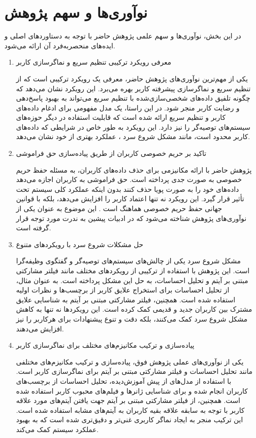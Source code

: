 \section{نوآوری‌ها و سهم پژوهش}
در این بخش، نوآوری‌ها و سهم علمی پژوهش حاضر با توجه به دستاوردهای اصلی و ایده‌های منحصربه‌فرد آن ارائه می‌شود.
\begin{enumerate}
\item
معرفی رویکرد ترکیبی تنظیم سریع و نماگر‌سازی کاربر

یکی از مهم‌ترین نوآوری‌های پژوهش حاضر، معرفی یک رویکرد ترکیبی است که از تنظیم سریع و نماگر‌سازی پیشرفته کاربر بهره می‌برد. این رویکرد نشان می‌دهد که چگونه تلفیق داده‌های شخصی‌سازی‌شده با تنظیم سریع می‌تواند به بهبود پاسخ‌دهی و رضایت کاربر منجر شود. در این راستا، یک مدل مفهومی برای ادغام داده‌های کاربر و تنظیم سریع ارائه شده است که قابلیت استفاده در دیگر حوزه‌های سیستم‌های توصیه‌گر را نیز دارد. این رویکرد به طور خاص در شرایطی که داده‌های کاربر محدود است، مانند مشکل شروع سرد ، عملکرد بهتری از خود نشان می‌دهد.

\item
تاکید بر حریم خصوصی کاربران از طریق پیاده‌سازی حق فراموشی

پژوهش حاضر با ارائه مکانیزمی برای حذف داده‌های کاربران، به مسئله حفظ حریم خصوصی به صورت جدی پرداخته است. حق فراموشی به کاربران اجازه می‌دهد داده‌های خود را به صورت پویا حذف کنند بدون اینکه عملکرد کلی سیستم تحت تأثیر قرار گیرد. این رویکرد نه تنها اعتماد کاربر را افزایش می‌دهد، بلکه با قوانین جهانی حفظ حریم خصوصی هماهنگ است . این موضوع به عنوان یکی از نوآوری‌های پژوهش شناخته می‌شود که در ادبیات پیشین به ندرت مورد توجه قرار گرفته است.

\item
حل مشکلات شروع سرد با رویکردهای متنوع

مشکل شروع سرد یکی از چالش‌های سیستم‌های توصیه‌گر و گفتگوی وظیفه‌گرا است. این پژوهش با استفاده از ترکیبی از رویکردهای مختلف مانند فیلتر مشارکتی مبتنی بر آیتم و تحلیل احساسات، به حل این مشکل پرداخته است. به عنوان مثال، از تحلیل احساسات برای استخراج علایق کاربر از برچسب‌ها و نظرات اولیه استفاده شده است. همچنین، فیلتر مشارکتی مبتنی بر آیتم به شناسایی علایق مشترک بین کاربران جدید و قدیمی کمک کرده است. این رویکردها نه تنها به کاهش مشکل شروع سرد کمک می‌کنند، بلکه دقت و تنوع پیشنهادات برای هرکاربر را نیز افزایش می‌دهند.

\item
پیاده‌سازی و ترکیب مکانیزم‌های مختلف برای نماگر‌سازی کاربر

یکی از نوآوری‌های عملی پژوهش فوق، پیاده‌سازی و ترکیب مکانیزم‌های مختلفی مانند تحلیل احساسات و فیلتر مشارکتی مبتنی بر آیتم برای نماگر‌سازی کاربر است. با استفاده از مدل‌های از پیش آموزش‌دیده، تحلیل احساسات از برچسب‌های کاربران انجام شده و برای شناسایی ژانرها و فیلم‌های محبوب کاربر استفاده شده است. همچنین، از فیلتر مشارکتی مبتنی بر آیتم جهت یافتن آیتم‌های مورد علاقه کاربر با توجه به سابقه علاقه بقیه کاربران به آیتم‌های مشابه استفاده شده است. این ترکیب منجر به ایجاد نماگر کاربری غنی‌تر و دقیق‌تری شده است که به بهبود عملکرد سیستم کمک می‌کند.


\end{enumerate}
